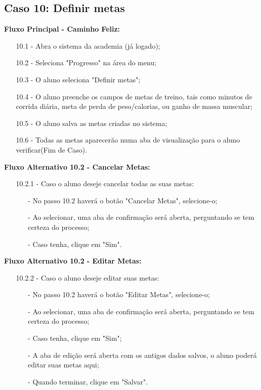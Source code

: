 \documentclass{article}
\begin{document}
\subsection{Caso 10: Definir metas}

    \textbf{Fluxo Principal - Caminho Feliz:}

    \begin{itemize}
        \item[10.1 -] Abra o sistema da academia (já logado);
        \item[10.2 -] Seleciona "Progresso" na área do menu;
        \item[10.3 -] O aluno seleciona "Definir metas";
        \item[10.4 -] O aluno preenche os campos de metas de treino, tais como minutos de corrida diária, meta de perda de peso/calorias, ou ganho de massa muscular;
        \item[10.5 -] O aluno salva as metas criadas no sistema;
        \item[10.6 -] Todas as metas aparecerão numa aba de visualização para o aluno verificar(Fim de Caso).
    \end{itemize}

    \textbf{Fluxo Alternativo 10.2 - Cancelar Metas:}

    \begin{itemize}
        \item[10.2.1 -]  Caso o aluno deseje cancelar todas as suas metas:
        \begin{itemize}
            \item[-] No passo 10.2 haverá o botão "Cancelar Metas", selecione-o;
            \item[-] Ao selecionar, uma aba de confirmação será aberta, perguntando se tem certeza do processo;
            \item[-] Caso tenha, clique em "Sim".
        \end{itemize}
    \end{itemize}

    \textbf{Fluxo Alternativo 10.2 - Editar Metas:}

    \begin{itemize}
        \item[10.2.2 -] Caso o aluno deseje editar suas metas:
        \begin{itemize}
            \item[-] No passo 10.2 haverá o botão "Editar Metas", selecione-o;
            \item[-] Ao selecionar, uma aba de confirmação será aberta, perguntando se tem certeza do processo;
            \item[-] Caso tenha, clique em "Sim";
            \item[-] A aba de edição será aberta com os antigos dados salvos, o aluno poderá editar suas metas aqui;
            \item[-] Quando terminar, clique em "Salvar".
        \end{itemize}
    \end{itemize}
\end{document}
